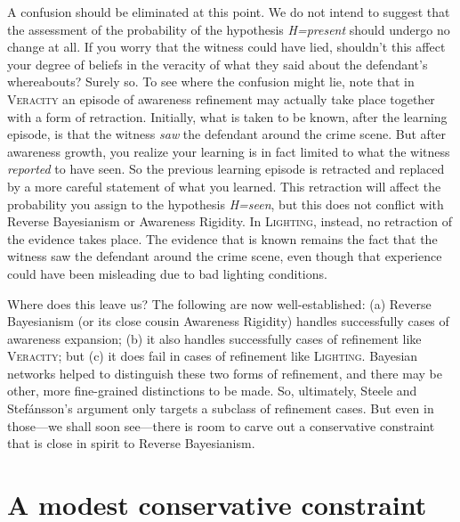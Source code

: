\documentclass[
  11pt,
  dvipsnames,enabledeprecatedfontcommands]{scrartcl}
\begin{document}
A confusion should be eliminated at this point. We do not intend to
suggest that the assessment of the probability of the hypothesis
\textit{H=present} should undergo no change at all. If you worry that
the witness could have lied, shouldn't this affect your degree of
beliefs in the veracity of what they said about the defendant's
whereabouts? Surely so. To see where the confusion might lie, note that
in \textsc{Veracity} an episode of awareness refinement may actually
take place together with a form of retraction. Initially, what is taken
to be known, after the learning episode, is that the witness
\textit{saw} the defendant around the crime scene. But after awareness
growth, you realize your learning is in fact limited to what the witness
\textit{reported} to have seen. So the previous learning episode is
retracted and replaced by a more careful statement of what you learned.
This retraction will affect the probability you assign to the hypothesis
\textit{H=seen}, but this does not conflict with Reverse Bayesianism or
Awareness Rigidity. In \textsc{Lighting}, instead, no retraction of the
evidence takes place. The evidence that is known remains the fact that
the witness saw the defendant around the crime scene, even though that
experience could have been misleading due to bad lighting conditions.

Where does this leave us? The following are now well-established: (a)
Reverse Bayesianism (or its close cousin Awareness Rigidity) handles
successfully cases of awareness expansion; (b) it also handles
successfully cases of refinement like \textsc{Veracity}; but (c) it does
fail in cases of refinement like \textsc{Lighting}. Bayesian networks
helped to distinguish these two forms of refinement, and there may be
other, more fine-grained distinctions to be made. So, ultimately, Steele
and Stefánsson's argument only targets a subclass of refinement cases.
But even in those---we shall soon see---there is room to carve out a
conservative constraint that is close in spirit to Reverse Bayesianism.

\hypertarget{a-modest-conservative-constraint}{%
\section{A modest conservative
constraint}\label{a-modest-conservative-constraint}}
\end{document}
